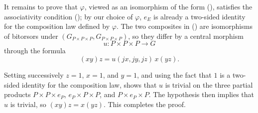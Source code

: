 It remains to prove that $\varphi$, viewed as an isomorphism of the form
(), satisfies the associativity condition (); by our
choice of $\varphi$, $e_E$ is already a two-sided identity for the
composition law defined by $\varphi$. The two composites in ()
are isomorphisms of bitorsors under
$(G_{P\times P\times P},G_{P\times P\times P})$, so they differ by a
central morphism
\begin{equation*}
 u:P\times P\times P\longrightarrow G
\end{equation*}
through the formula
\begin{equation*}
 (xy)z=u(jx,jy,jz)\,x(yz).
\end{equation*}


Setting successively $z=1$, $x=1$, and $y=1$, and using the fact that
$1$ is a two-sided identity for the composition law, shows that $u$ is
trivial on the three partial products $P\times P\times e_P$,
$e_P\times P\times P$, and $P\times e_P\times P$. The hypothesis then
implies that $u$ is trivial, so $(xy)z=x(yz)$. This completes the proof.

